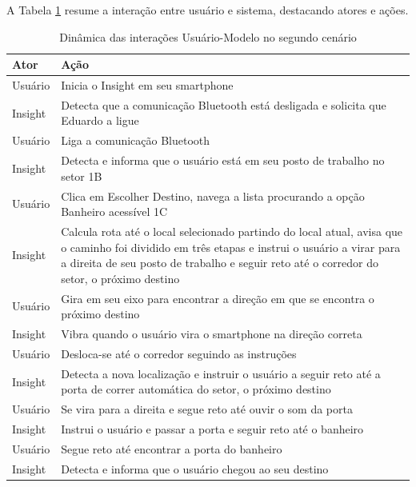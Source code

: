 \documentclass[twoside,english,brazilian]{UNISINOSartigo}
\begin{document}
A Tabela \ref{tab:cenario2} resume a interação entre usuário e sistema, destacando atores e ações.

\begin{table}
	\caption{Dinâmica das interações Usuário-Modelo no segundo cenário}
	\label{tab:cenario2}
	\centering%
	\begin{minipage}{0.9\textwidth}
		\begin{adjustbox}{max width=\textwidth}
			\begin{tabular}{ p{} | p{14cm} }
				\hline
			 	\textbf{Ator} & \textbf{Ação}\\
				\hline
Usuário & Inicia o Insight em seu smartphone \\
Insight & Detecta que a comunicação Bluetooth está desligada e solicita que Eduardo a ligue \\
Usuário & Liga a comunicação Bluetooth \\
Insight & Detecta e informa que o usuário está em seu posto de trabalho no setor 1B \\
Usuário & Clica em Escolher Destino, navega a lista procurando a opção Banheiro acessível 1C \\
Insight & Calcula rota até o local selecionado partindo do local atual, avisa que o caminho foi dividido em três etapas e instrui o usuário a virar para a direita de seu posto de trabalho e seguir reto até o corredor do setor, o próximo destino \\
Usuário & Gira em seu eixo para encontrar a direção em que se encontra o próximo destino \\
Insight & Vibra quando o usuário vira o smartphone na direção correta \\
Usuário & Desloca-se até o corredor seguindo as instruções \\
Insight & Detecta a nova localização e instruir o usuário a seguir reto até a porta de correr automática do setor, o próximo destino \\
Usuário & Se vira para a direita e segue reto até ouvir o som da porta \\
Insight & Instrui o usuário e passar a porta e seguir reto até o banheiro \\
Usuário & Segue reto até encontrar a porta do banheiro \\
Insight & Detecta e informa que o usuário chegou ao seu destino \\


\end{tabular}
\end{adjustbox}
\end{minipage}
\end{table}
\end{document}
